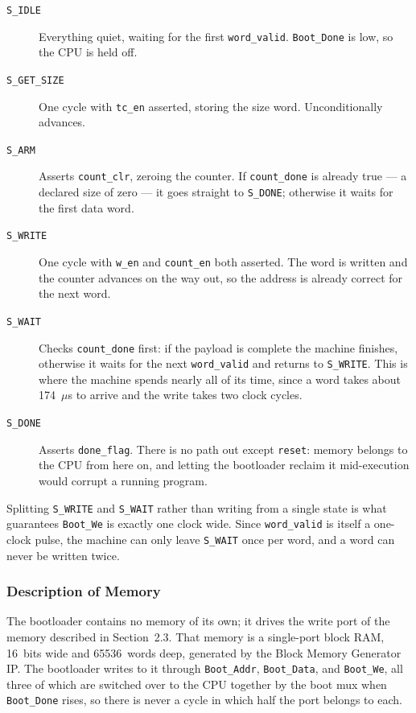 \documentclass[11pt,letterpaper]{article}
\begin{document}
\begin{description}
  \item[\texttt{S\_IDLE}] Everything quiet, waiting for the first
    \texttt{word\_valid}. \texttt{Boot\_Done} is low, so the CPU is held off.
  \item[\texttt{S\_GET\_SIZE}] One cycle with \texttt{tc\_en} asserted,
    storing the size word. Unconditionally advances.
  \item[\texttt{S\_ARM}] Asserts \texttt{count\_clr}, zeroing the counter. If
    \texttt{count\_done} is already true --- a declared size of zero --- it goes
    straight to \texttt{S\_DONE}; otherwise it waits for the first data word.
  \item[\texttt{S\_WRITE}] One cycle with \texttt{w\_en} and \texttt{count\_en}
    both asserted. The word is written and the counter advances on the way out,
    so the address is already correct for the next word.
  \item[\texttt{S\_WAIT}] Checks \texttt{count\_done} first: if the payload is
    complete the machine finishes, otherwise it waits for the next
    \texttt{word\_valid} and returns to \texttt{S\_WRITE}. This is where the
    machine spends nearly all of its time, since a word takes about 174~$\mu$s
    to arrive and the write takes two clock cycles.
  \item[\texttt{S\_DONE}] Asserts \texttt{done\_flag}. There is no path out
    except \texttt{reset}: memory belongs to the CPU from here on, and letting
    the bootloader reclaim it mid-execution would corrupt a running program.
\end{description}

Splitting \texttt{S\_WRITE} and \texttt{S\_WAIT} rather than writing from a
single state is what guarantees \texttt{Boot\_We} is exactly one clock wide.
Since \texttt{word\_valid} is itself a one-clock pulse, the machine can only
leave \texttt{S\_WAIT} once per word, and a word can never be written twice.

\subsubsection{Description of Memory}
The bootloader contains no memory of its own; it drives the write port of the
memory described in Section~2.3. That memory is a single-port block RAM,
16~bits wide and 65536~words deep, generated by the Block Memory Generator IP.
The bootloader writes to it through \texttt{Boot\_Addr}, \texttt{Boot\_Data},
and \texttt{Boot\_We}, all three of which are switched over to the CPU together
by the boot mux when \texttt{Boot\_Done} rises, so there is never a cycle in
which half the port belongs to each.
\end{document}
